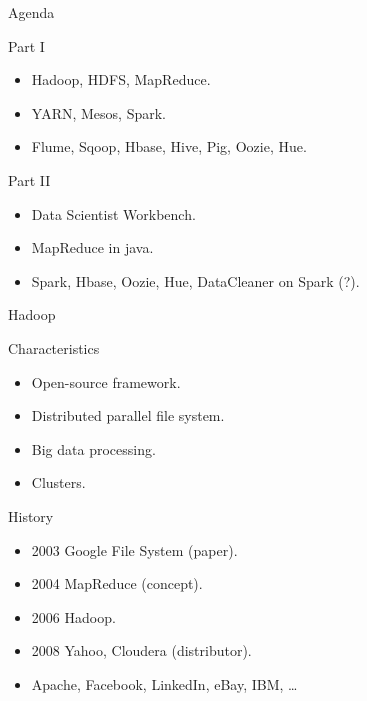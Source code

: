 
\begin{frame}{Agenda}
  \begin{block}{Part I}
    \begin{itemize}
      \item Hadoop, HDFS, MapReduce. 
      \item YARN, Mesos, Spark.
      \item Flume, Sqoop, Hbase, Hive, Pig, Oozie, Hue. 
    \end{itemize}
  \end{block}
  \begin{block}{Part II}
    \begin{itemize}
      \item Data Scientist Workbench.
      \item MapReduce in java.
      \item Spark, Hbase, Oozie, Hue, DataCleaner on Spark (?).
    \end{itemize}
  \end{block}
\end{frame}

\begin{frame}{Hadoop}
  \begin{block}{Characteristics}
    \begin{itemize}
      \item Open-source framework.
      \item Distributed parallel file system.
      \item Big data processing.
      \item Clusters.
    \end{itemize}
  \end{block}
  \begin{block}{History}
    \begin{itemize}
      \item 2003 Google File System (paper). 
      \item 2004 MapReduce (concept).
      \item 2006 Hadoop.
      \item 2008 Yahoo, Cloudera (distributor).
      \item Apache, Facebook, LinkedIn, eBay, IBM, \dots
    \end{itemize}
  \end{block}
\end{frame}

